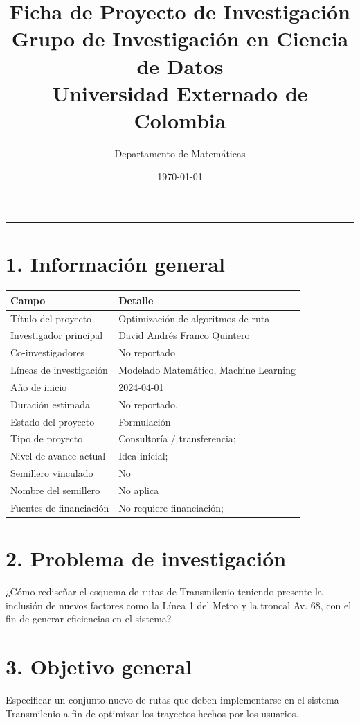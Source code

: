 \documentclass[a4paper,12pt]{article}
\title{
\vspace{-8mm}
\textbf{\textcolor{ExternadoGreen}{Ficha de Proyecto de Investigación}}\\
\large \textcolor{ExternadoDark}{Grupo de Investigación en Ciencia de Datos}\\
\large \textcolor{ExternadoDark}{Universidad Externado de Colombia}
}
\author{\textcolor{ExternadoDark}{Departamento de Matemáticas}}
\date{\textcolor{ExternadoDark}{\today}}
\begin{document}
\maketitle
\vspace{-3mm}
\noindent\textcolor{ExternadoDark}{\rule{\textwidth}{0.6pt}}

\section*{1. Información general}
\begin{longtable}{p{4.2cm} p{10.4cm}}
\toprule
\textbf{Campo} & \textbf{Detalle} \\
\midrule
Título del proyecto & Optimización de algoritmos de ruta \\
Investigador principal & David Andrés Franco Quintero \\
Co-investigadores & No reportado \\
Líneas de investigación & Modelado Matemático, Machine Learning \\
Año de inicio & 2024-04-01 \\
Duración estimada & No reportado. \\
Estado del proyecto & Formulación \\
Tipo de proyecto & Consultoría / transferencia; \\
Nivel de avance actual & Idea inicial; \\
Semillero vinculado & No \\
Nombre del semillero & No aplica \\
Fuentes de financiación & No requiere financiación; \\
\bottomrule
\end{longtable}

\section*{2. Problema de investigación}
¿Cómo rediseñar el esquema de rutas de Transmilenio teniendo presente la inclusión de nuevos factores como la Línea 1 del Metro y la troncal Av. 68, con el fin de generar eficiencias en el sistema?

\section*{3. Objetivo general}
Especificar un conjunto nuevo de rutas que deben implementarse en el sistema Transmilenio a fin de optimizar los trayectos hechos por los usuarios.
\end{document}
